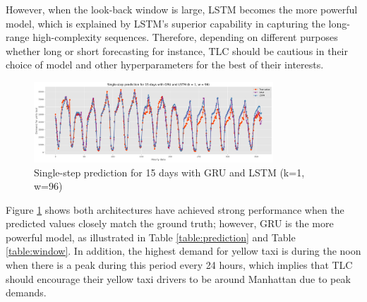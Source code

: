 \documentclass[11pt]{article}
\begin{document}
However, when the look-back window is large, LSTM becomes the more powerful model, which is explained by LSTM's superior capability in capturing  the long-range high-complexity sequences. Therefore, depending on different purposes whether long or short forecasting for instance, TLC should be cautious in their choice of model and other hyperparameters for the best of their interests.





\begin{figure}[ht]
    \centering
    \includegraphics[width=0.8\textwidth]{plots/better.png}
    \caption{Single-step prediction for 15 days with GRU and LSTM (k=1, w=96)}
    \label{fig:singlestep}
\end{figure}

Figure \ref{fig:singlestep} shows both architectures have achieved strong performance when the predicted values closely match the ground truth; however, GRU is the more powerful model, as illustrated in Table \ref{table:prediction} and Table \ref{table:window}. In addition, the highest demand for yellow taxi is during the noon when there is a peak during this period every 24 hours, which implies that TLC should encourage their yellow taxi drivers to be around Manhattan due to peak demands.  
\end{document}
